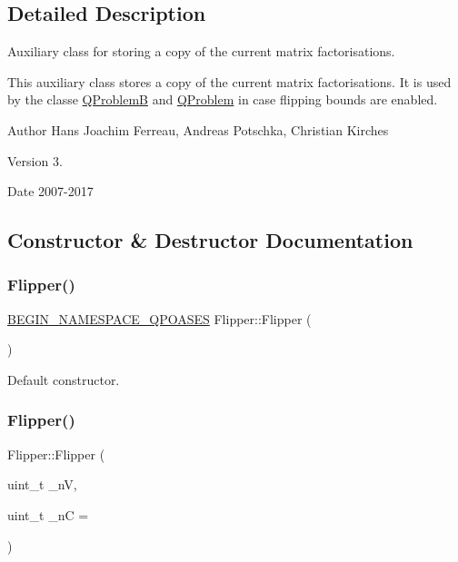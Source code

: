 \subsection{Detailed Description}
Auxiliary class for storing a copy of the current matrix factorisations. 

This auxiliary class stores a copy of the current matrix factorisations. It is used by the classe \hyperlink{class_q_problem_b}{Q\+ProblemB} and \hyperlink{class_q_problem}{Q\+Problem} in case flipping bounds are enabled.

\begin{DoxyAuthor}{Author}
Hans Joachim Ferreau, Andreas Potschka, Christian Kirches 
\end{DoxyAuthor}
\begin{DoxyVersion}{Version}
3. 
\end{DoxyVersion}
\begin{DoxyDate}{Date}
2007-\/2017 
\end{DoxyDate}


\subsection{Constructor \& Destructor Documentation}
\mbox{\label{class_flipper_a375f713a471ba59c77da0d5bce22ccbf}} 
\subsubsection{\texorpdfstring{Flipper()}{Flipper()}\hspace{0.1cm}{\footnotesize\ttfamily [1/3]}}
{\footnotesize\ttfamily \hyperlink{_types_8hpp_afd127fcb3c8f47975e9fa0ec2bacde52}{B\+E\+G\+I\+N\+\_\+\+N\+A\+M\+E\+S\+P\+A\+C\+E\+\_\+\+Q\+P\+O\+A\+S\+ES} Flipper\+::\+Flipper (\begin{DoxyParamCaption}{ }\end{DoxyParamCaption})}

Default constructor. \mbox{\label{class_flipper_ab92d2eee560f2f55631a6af9e0175bbf}} 
\subsubsection{\texorpdfstring{Flipper()}{Flipper()}\hspace{0.1cm}{\footnotesize\ttfamily [2/3]}}
{\footnotesize\ttfamily Flipper\+::\+Flipper (\begin{DoxyParamCaption}\item[{uint\+\_\+t}]{\+\_\+nV,  }\item[{uint\+\_\+t}]{\+\_\+nC = {} }\end{DoxyParamCaption})}

